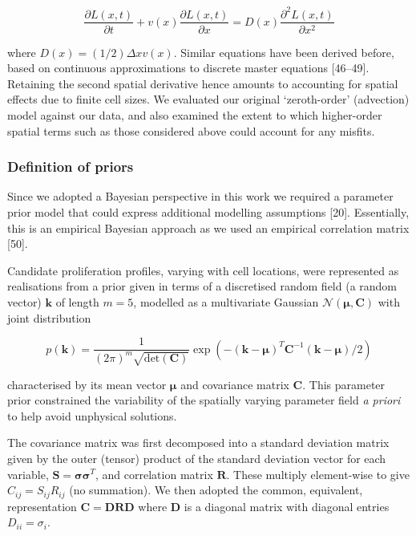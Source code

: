 \documentclass[10pt,letterpaper]{article}
\begin{document}
\begin{equation}\frac{\partial L(x,t)}{\partial t} + v(x)\frac{\partial L(x,t)}{\partial x} = D(x)\frac{\partial^2 L(x,t)}{\partial x^2}\label{eq:model-pde-higher-two}\end{equation}

where \(D(x) = (1/2)\Delta x v(x)\). Similar equations have been derived
before, based on continuous approximations to discrete master equations
{[}46--49{]}. Retaining the second spatial derivative hence amounts to
accounting for spatial effects due to finite cell sizes. We evaluated
our original `zeroth-order' (advection) model against our data, and also
examined the extent to which higher-order spatial terms such as those
considered above could account for any misfits.

\subsubsection{Definition of priors}\label{definition-of-priors}

Since we adopted a Bayesian perspective in this work we required a
parameter prior model that could express additional modelling
assumptions {[}20{]}. Essentially, this is an empirical Bayesian
approach as we used an empirical correlation matrix {[}50{]}.

Candidate proliferation profiles, varying with cell locations, were
represented as realisations from a prior given in terms of a discretised
random field (a random vector) \(\mathbf{k}\) of length \(m=5\),
modelled as a multivariate Gaussian
\(\mathcal{N}(\boldsymbol{\mu},\mathbf{C})\) with joint distribution

\begin{equation}p(\mathbf{k}) = \frac{1}{(2\pi)^m\sqrt{\mbox{det}(\mathbf{C})}}\exp(-(\mathbf{k}-\boldsymbol{\mu})^T\mathbf{C}^{-1}(\mathbf{k}-\boldsymbol{\mu})/2)\label{eq:prior}\end{equation}

characterised by its mean vector \(\boldsymbol{\mu}\) and covariance
matrix \(\mathbf{C}\). This parameter prior constrained the variability
of the spatially varying parameter field \emph{a priori} to help avoid
unphysical solutions.

The covariance matrix was first decomposed into a standard deviation
matrix given by the outer (tensor) product of the standard deviation
vector for each variable,
\(\mathbf{S} = \boldsymbol{\sigma}\boldsymbol{\sigma}^T\), and
correlation matrix \(\mathbf{R}\). These multiply element-wise to give
\(C_{ij} = S_{ij}R_{ij}\) (no summation). We then adopted the common,
equivalent, representation
\(\mathbf{C} = \mathbf{D}\mathbf{R}\mathbf{D}\) where \(\mathbf{D}\) is
a diagonal matrix with diagonal entries \(D_{ii} = \sigma_i\).
\end{document}
